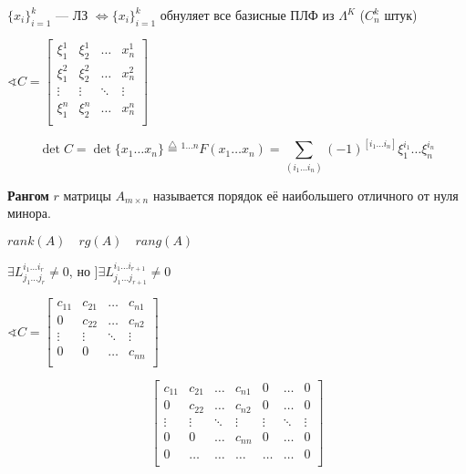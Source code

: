 

\cfoot{}

\newcommand\Warning{%
 \makebox[1.4em][c]{%
 \makebox[0pt][c]{\raisebox{.1em}{\small!}}%
 \makebox[0pt][c]{\color{red}\Large$\bigtriangleup$}}}%



\begin{remark}
    \(\{x_i\}_{i=1}^k\) --- ЛЗ \(\Leftrightarrow \{x_i\}_{i=1}^k\) обнуляет все базисные ПЛФ из $\Lambda^K$ ($C^k_n$ штук)
\end{remark}

\(\sphericalangle C=\begin{bmatrix}
    \xi_1^1 & \xi_2^1 & \ldots & x_n^1 \\
    \xi_1^2 & \xi_2^2 & \ldots & x_n^2 \\
    \vdots & \vdots & \ddots & \vdots \\
    \xi_1^n & \xi_2^n & \ldots & x_n^n \\
\end{bmatrix}\)

$$\det C = \det \{x_1\ldots x_n\} \stackrel{\triangle}{=} {}^{1\ldots n}F(x_1\ldots x_n) = \sum\limits_{(i_1\ldots i_n)} (-1)^{[i_1\ldots i_n]} \xi_1^{i_1}\ldots \xi_n^{i_n}$$

\begin{definition}
    \textbf{Рангом} $r$ матрицы $A_{m\times n}$ называется порядок её наибольшего отличного от нуля минора.
\end{definition}

\begin{remark}
    $rank(A) \quad rg(A) \quad rang(A)$

    $\exists L_{j_1\ldots j_r}^{i_1\ldots i_r}\not=0$, но $] \exists L_{j_1\ldots j_{r+1}}^{i_1\ldots i_{r+1}} \not = 0$
\end{remark}

\(\sphericalangle C=\begin{bmatrix}
    c_{11} & c_{21} & \ldots & c_{n1} \\
    0 & c_{22} & \ldots & c_{n2} \\
    \vdots & \vdots & \ddots & \vdots \\
    0 & 0 & \ldots & c_{nn} \\
\end{bmatrix}\)


$$\begin{bmatrix}
    c_{11} & c_{21} & \ldots & c_{n1} & 0 & \ldots & 0 \\
    0 & c_{22} & \ldots & c_{n2} & 0 & \ldots & 0\\
    \vdots & \vdots & \ddots & \vdots & \vdots & \ddots & \vdots\\
    0 & 0 & \ldots & c_{nn} & 0 & \ldots & 0\\
    0 & \ldots &\ldots &\ldots &\ldots & \ldots & 0 \\
\end{bmatrix}$$

